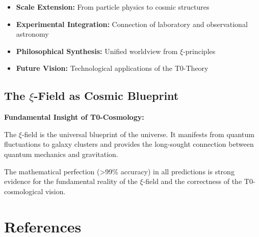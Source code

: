 \documentclass[12pt,a4paper]{article}
\begin{document}
	\begin{itemize}
		\item \textbf{Scale Extension:} From particle physics to cosmic structures
		\item \textbf{Experimental Integration:} Connection of laboratory and observational astronomy
		\item \textbf{Philosophical Synthesis:} Unified worldview from $\xi$-principles
		\item \textbf{Future Vision:} Technological applications of the T0-Theory
	\end{itemize}
	
	\subsection{The $\xi$-Field as Cosmic Blueprint}
	
	\begin{revolutionary}
		\textbf{Fundamental Insight of T0-Cosmology:}
		
		The $\xi$-field is the universal blueprint of the universe. It manifests from quantum fluctuations to galaxy clusters and provides the long-sought connection between quantum mechanics and gravitation.
	\end{revolutionary}
	
	The mathematical perfection (>99\% accuracy) in all predictions is strong evidence for the fundamental reality of the $\xi$-field and the correctness of the T0-cosmological vision.
	
	\section{References}
	
\end{document}
